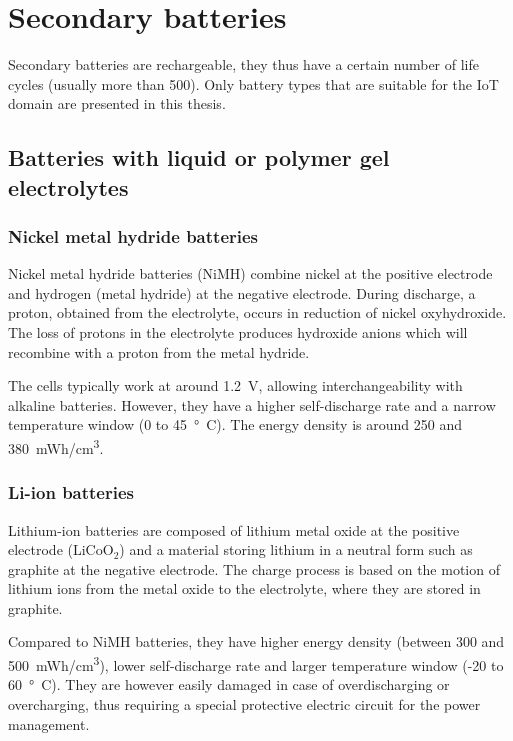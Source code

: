 \documentclass{EPL-master-thesis-covers-EN}
\begin{document}
\section{Secondary batteries}

Secondary batteries are rechargeable, they thus have a certain number of life cycles (usually more than 500). Only battery types that are suitable for the IoT domain are presented in this thesis.

\subsection*{Batteries with liquid or polymer gel electrolytes}


\subsubsection*{Nickel metal hydride batteries}

Nickel metal hydride batteries (NiMH) combine nickel at the positive electrode and hydrogen (metal hydride) at the negative electrode.  During discharge, a proton, obtained from the electrolyte, occurs in reduction of nickel oxyhydroxide. The loss of protons in the electrolyte produces hydroxide anions which will recombine with a proton from the metal hydride.

The cells typically work at around \SI{1.2}{V}, allowing interchangeability with alkaline batteries. However, they have a higher self-discharge rate and a narrow temperature window (0 to \SI{45}{\degree C}). The energy density is around 250 and \SI{380}{mWh/cm^3}.

\subsubsection*{Li-ion batteries}

Lithium-ion batteries are composed of lithium metal oxide at the positive electrode (LiCoO${}_2$) and a material storing lithium in a neutral form such as graphite at the negative electrode. The charge process is based on the motion of lithium ions from the metal oxide to the electrolyte, where they are stored in graphite.

Compared to NiMH batteries, they have higher energy density (between 300 and \SI{500}{mWh/cm^3}), lower self-discharge rate and larger temperature window (-20 to \SI{60}{\degree C}). They are however easily damaged in case of overdischarging or overcharging, thus requiring a special protective electric circuit for the power management.
\end{document}
